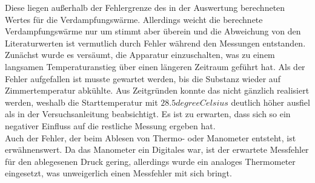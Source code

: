 Diese liegen außerhalb der Fehlergrenze des in der Auswertung berechneten Wertes für die 
Verdampfungswärme. Allerdings weicht die berechnete Verdampfungswärme nur um  stimmt aber überein und die Abweichung von den 
Literaturwerten ist vermutlich durch Fehler während den Messungen entstanden.
Zunächst wurde es versäumt, die Apparatur einzuschalten, was zu einem langsamen Temperaturanstieg über einen längeren Zeitraum geführt hat. Als der Fehler aufgefallen
ist musste gewartet werden, bis die Substanz wieder auf Zimmertemperatur abkühlte. Aus Zeitgründen konnte das nicht gänzlich realisiert werden, weshalb die Starttemperatur 
mit $ 28.5 \si{degreeCelsius}$ deutlich höher ausfiel als in der Versuchsanleitung beabsichtigt. Es ist zu erwarten, dass sich so ein negativer Einfluss auf die restliche Messung
ergeben hat. \\
Auch der Fehler, der beim Ablesen von Thermo- oder Manometer entsteht, ist erwähnenswert. Da das Manometer ein Digitales war, ist der erwartete Messfehler für den ablegesenen 
Druck gering, allerdings wurde ein analoges Thermometer eingesetzt, was unweigerlich einen Messfehler mit sich bringt.


